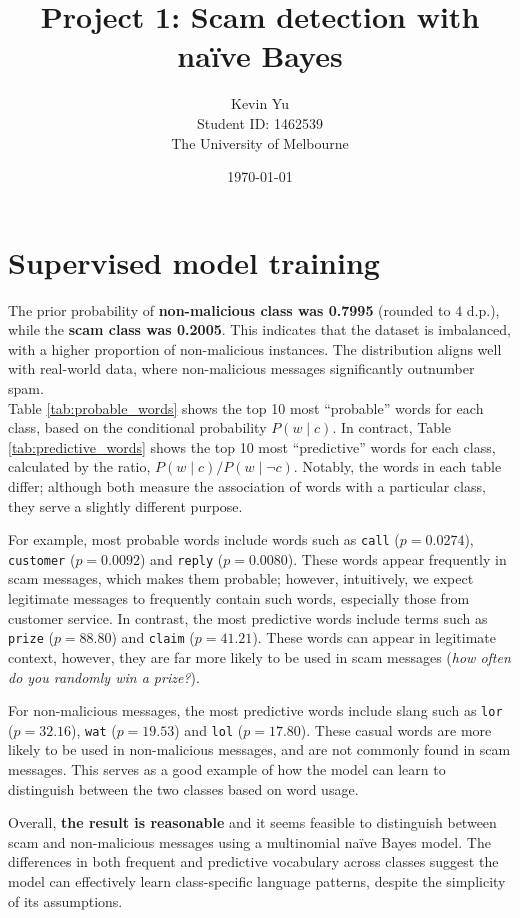 \documentclass[a4paper,12pt]{article}
\title{Project 1: Scam detection with naïve Bayes}
\author{Kevin Yu \\ Student ID: 1462539 \\ The University of Melbourne}
\date{\today}
\begin{document}
\maketitle

\newpage

\section{Supervised model training}

The prior probability of \textbf{non-malicious class was 0.7995} (rounded to $4$ d.p.), while the \textbf{scam class was 0.2005}. This indicates that the dataset is imbalanced, with a higher proportion of non-malicious instances. The distribution aligns well with real-world data, where non-malicious messages significantly outnumber spam. \\

Table \ref{tab:probable_words} shows the top 10 most ``probable'' words for each class, based on the conditional probability $P(w \mid c)$. In contract, Table \ref{tab:predictive_words} shows the top 10 most ``predictive'' words for each class, calculated by the ratio, $P(w \mid c) / P(w \mid \neg c)$. Notably, the words in each table differ; although both measure the association of words with a particular class, they serve a slightly different purpose. 

For example, most probable words include words such as \texttt{call} ($p = 0.0274$), \texttt{customer} ($p = 0.0092$) and \texttt{reply} ($p = 0.0080$). These words appear frequently in scam messages, which makes them probable; however, intuitively, we expect legitimate messages to frequently contain such words, especially those from customer service. In contrast, the most predictive words include terms such as \texttt{prize} ($p = 88.80$) and \texttt{claim} ($p = 41.21$). These words can appear in legitimate context, however, they are far more likely to be used in scam messages (\textit{how often do you randomly win a prize?}).

For non-malicious messages, the most predictive words include slang such as \texttt{lor} ($p = 32.16$), \texttt{wat} ($p = 19.53$) and \texttt{lol} ($p = 17.80$). These casual words are more likely to be used in non-malicious messages, and are not commonly found in scam messages. This serves as a good example of how the model can learn to distinguish between the two classes based on word usage.

Overall, \textbf{the result is reasonable} and it seems feasible to distinguish between scam and non-malicious messages using a multinomial naïve Bayes model. The differences in both frequent and predictive vocabulary across classes suggest the model can effectively learn class-specific language patterns, despite the simplicity of its assumptions.
\end{document}

